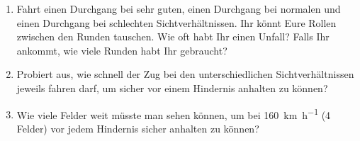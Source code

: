   \task
    \begin{enumerate}[label=\alph*)]
      \item Fahrt einen Durchgang bei sehr guten, einen Durchgang bei normalen und einen Durchgang bei schlechten Sichtverhältnissen. Ihr könnt Eure Rollen zwischen den Runden tauschen. Wie oft habt Ihr einen Unfall? Falls Ihr ankommt, wie viele Runden habt Ihr gebraucht?
      \item Probiert aus, wie schnell der Zug bei den unterschiedlichen Sichtverhältnissen jeweils fahren darf, um sicher vor einem Hindernis anhalten zu können?
      \item Wie viele Felder weit müsste man sehen können, um bei \SI{160}{\kilo\metre\per\hour} (4 Felder) vor jedem Hindernis sicher anhalten zu können?
    \end{enumerate}
